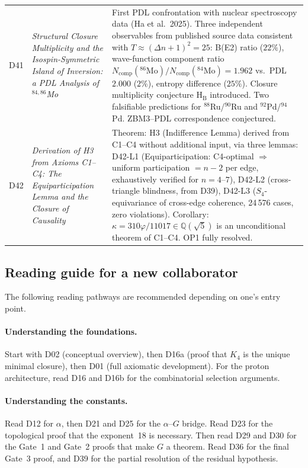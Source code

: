 \documentclass[11pt,a4paper]{article}
\theoremstyle{plain}
\theoremstyle{definition}
\theoremstyle{remark}
\newcommand{\Kfour}{K_4}
\begin{document}
\begin{longtable}{@{}L{1.3cm}L{3.8cm}L{8.0cm}@{}}
D41 & \textit{Structural Closure Multiplicity and the Isospin-Symmetric Island of Inversion: a PDL Analysis of $^{84,86}$Mo}~\citep{D41} & First PDL confrontation with nuclear spectroscopy data (Ha et al.\ 2025). Three independent observables from published source data consistent with $T \approx (\Delta n+1)^2 = 25$: B(E2) ratio ($22\%$), wave-function component ratio $N_{\mathrm{comp}}(^{86}\text{Mo})/N_{\mathrm{comp}}(^{84}\text{Mo}) = 1.962$ vs.\ PDL $2.000$ ($2\%$), entropy difference ($25\%$). Closure multiplicity conjecture H$_\mathrm{B}$ introduced. Two falsifiable predictions for $^{88}$Ru/$^{90}$Ru and $^{92}$Pd/$^{94}$Pd. ZBM3--PDL correspondence conjectured. \\[0.4em]

D42 & \textit{Derivation of H3 from Axioms C1--C4: The Equiparticipation Lemma and the Closure of Causality}~\citep{D42} & \textcolor{proofblue}{Theorem}: H3 (Indifference Lemma) derived from C1--C4 without additional input, via three lemmas: D42-L1 (Equiparticipation: C4-optimal $\Rightarrow$ uniform participation $= n-2$ per edge, exhaustively verified for $n=4$--$7$), D42-L2 (cross-triangle blindness, from D39), D42-L3 ($S_4$-equivariance of cross-edge coherence, 24\,576 cases, zero violations). Corollary: $\kappa = 310\varphi/11017 \in \mathbb{Q}(\sqrt{5})$ is an unconditional theorem of C1--C4. OP1 fully resolved. \\[0.4em]

\end{longtable}

\subsection{Reading guide for a new collaborator}
\label{subsec:reading_guide}

The following reading pathways are recommended depending on one's entry point.

\paragraph{Understanding the foundations.}
Start with D02 (conceptual overview), then D16a (proof that $\Kfour$ is the unique minimal closure), then D01 (full axiomatic development).
For the proton architecture, read D16 and D16b for the combinatorial selection arguments.

\paragraph{Understanding the constants.}
Read D12 for $\alpha$, then D21 and D25 for the $\alpha$--$G$ bridge.
Read D23 for the topological proof that the exponent~18 is necessary.
Then read D29 and D30 for the Gate~1 and Gate~2 proofs that make $G$ a theorem.
Read D36 for the final Gate~3 proof, and D39 for the partial resolution of the residual hypothesis.
\end{document}
